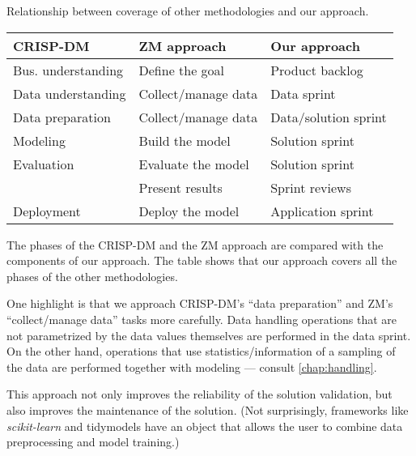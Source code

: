 \begin{tablebox}[label=tab:phases]{Relationship between coverage of other methodologies and our approach.}
  \centering
  \small %
  \begin{tabular}{lll}
    \toprule
    \textbf{CRISP-DM} & \textbf{ZM approach} & \textbf{Our approach} \\
    \midrule
    Bus. understanding & Define the goal & Product backlog \\
    Data understanding & Collect/manage data & Data sprint \\
    Data preparation & Collect/manage data & Data/solution sprint \\
    Modeling & Build the model & Solution sprint \\
    Evaluation & Evaluate the model & Solution sprint \\
    & Present results & Sprint reviews \\
    Deployment & Deploy the model & Application sprint \\
    \bottomrule
  \end{tabular}
  \tcblower
  The phases of the CRISP-DM and the ZM approach are compared with the components of our
  approach.  The table shows that our approach covers all the phases of the other
  methodologies.
\end{tablebox}

One highlight is that we approach CRISP-DM's ``data preparation'' and ZM's
``collect/manage data'' tasks more carefully.  Data handling operations that are not
parametrized by the data values themselves are performed in the data sprint.  On the other hand,
operations that use statistics/information of a sampling of the data are performed
together with modeling --- consult \cref{chap:handling}.

This approach not only improves the reliability of the solution validation, but also improves
the maintenance of the solution.  (Not surprisingly, frameworks like \textit{scikit-learn} and
tidymodels have an object that allows the user to combine data preprocessing and
model training.)


